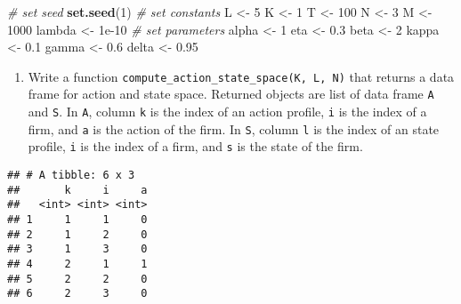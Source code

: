 \documentclass[
]{book}
\newenvironment{Shaded}{\begin{snugshade}}{\end{snugshade}}
\newcommand{\AttributeTok}[1]{\textcolor[rgb]{0.13,0.29,0.53}{#1}}
\newcommand{\CommentTok}[1]{\textcolor[rgb]{0.56,0.35,0.01}{\textit{#1}}}
\newcommand{\DecValTok}[1]{\textcolor[rgb]{0.00,0.00,0.81}{#1}}
\newcommand{\FloatTok}[1]{\textcolor[rgb]{0.00,0.00,0.81}{#1}}
\newcommand{\FunctionTok}[1]{\textcolor[rgb]{0.13,0.29,0.53}{\textbf{#1}}}
\newcommand{\NormalTok}[1]{#1}
\newcommand{\OtherTok}[1]{\textcolor[rgb]{0.56,0.35,0.01}{#1}}
\newcommand{\SpecialCharTok}[1]{\textcolor[rgb]{0.81,0.36,0.00}{\textbf{#1}}}
\providecommand{\tightlist}{%
  \setlength{\itemsep}{0pt}\setlength{\parskip}{0pt}}
\begin{document}
\begin{Shaded}
\begin{Highlighting}[]
\CommentTok{\# set seed}
\FunctionTok{set.seed}\NormalTok{(}\DecValTok{1}\NormalTok{)}
\CommentTok{\# set constants }
\NormalTok{L }\OtherTok{\textless{}{-}} \DecValTok{5}
\NormalTok{K }\OtherTok{\textless{}{-}} \DecValTok{1}
\NormalTok{T }\OtherTok{\textless{}{-}} \DecValTok{100}
\NormalTok{N }\OtherTok{\textless{}{-}} \DecValTok{3}
\NormalTok{M }\OtherTok{\textless{}{-}} \DecValTok{1000}
\NormalTok{lambda }\OtherTok{\textless{}{-}} \FloatTok{1e{-}10}
\CommentTok{\# set parameters}
\NormalTok{alpha }\OtherTok{\textless{}{-}} \DecValTok{1}
\NormalTok{eta }\OtherTok{\textless{}{-}} \FloatTok{0.3}
\NormalTok{beta }\OtherTok{\textless{}{-}} \DecValTok{2}
\NormalTok{kappa }\OtherTok{\textless{}{-}} \FloatTok{0.1}
\NormalTok{gamma }\OtherTok{\textless{}{-}} \FloatTok{0.6}
\NormalTok{delta }\OtherTok{\textless{}{-}} \FloatTok{0.95}
\end{Highlighting}
\end{Shaded}

\begin{enumerate}
\def\labelenumi{\arabic{enumi}.}
\setcounter{enumi}{1}
\tightlist
\item
  Write a function \texttt{compute\_action\_state\_space(K,\ L,\ N)} that returns a data frame for action and state space. Returned objects are list of data frame \texttt{A} and \texttt{S}. In \texttt{A}, column \texttt{k} is the index of an action profile, \texttt{i} is the index of a firm, and \texttt{a} is the action of the firm. In \texttt{S}, column \texttt{l} is the index of an state profile, \texttt{i} is the index of a firm, and \texttt{s} is the state of the firm.
\end{enumerate}

\begin{Shaded}
\end{Shaded}

\begin{verbatim}
## # A tibble: 6 x 3
##       k     i     a
##   <int> <int> <int>
## 1     1     1     0
## 2     1     2     0
## 3     1     3     0
## 4     2     1     1
## 5     2     2     0
## 6     2     3     0
\end{verbatim}
\end{document}
